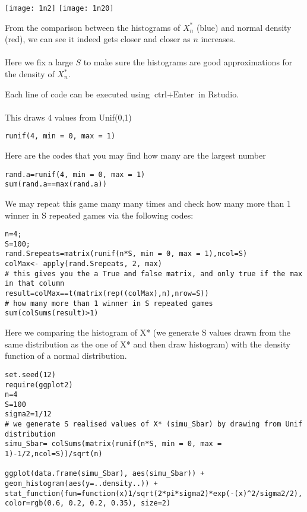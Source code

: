\begin{exercise}
\begin{solution}
 \begin{minipage}{0.45\textwidth}
 	\texttt{[image: 1n2]} 
 	\texttt{[image: 1n20]} 
 \end{minipage}
 \begin{minipage}[b]{0.45\textwidth}
 	From the comparison between the histograms of $X^*_n$ (blue) and normal density (red), we can see it indeed gets closer and closer as $n$ increases. \\~\\
 	Here we fix a large $S$ to make sure the histograms are good approximations for the density of $X_n^*$. 
 \end{minipage}
\newline
Each line of code can be executed using $\text{ctrl}+\text{Enter}$ in Rstudio.  
~\\~\\
This draws 4 values from Unif(0,1)
\begin{verbatim}
runif(4, min = 0, max = 1)
\end{verbatim}
Here are the codes that you may find how many are the largest number
\begin{verbatim}
rand.a=runif(4, min = 0, max = 1)
sum(rand.a==max(rand.a))
\end{verbatim}
We may repeat this game many many times and check how many more than 1 winner in S repeated games via the following codes:
\begin{verbatim}
n=4;
S=100;
rand.Srepeats=matrix(runif(n*S, min = 0, max = 1),ncol=S)
colMax<- apply(rand.Srepeats, 2, max)
# this gives you the a True and false matrix, and only true if the max in that column
result=colMax==t(matrix(rep((colMax),n),nrow=S))  
# how many more than 1 winner in S repeated games 
sum(colSums(result)>1) 
\end{verbatim}

Here we comparing the histogram of X* 
(we generate S values drawn from the same distribution as the one of X* and then draw histogram)
with the density function of a normal distribution.
\begin{verbatim}
set.seed(12)
require(ggplot2)
n=4
S=100
sigma2=1/12
# we generate S realised values of X* (simu_Sbar) by drawing from Unif distribution 
simu_Sbar= colSums(matrix(runif(n*S, min = 0, max = 1)-1/2,ncol=S))/sqrt(n)  

ggplot(data.frame(simu_Sbar), aes(simu_Sbar)) + 
geom_histogram(aes(y=..density..)) +
stat_function(fun=function(x)1/sqrt(2*pi*sigma2)*exp(-(x)^2/sigma2/2),
color=rgb(0.6, 0.2, 0.2, 0.35), size=2)
\end{verbatim}


\end{solution}
\end{exercise}
